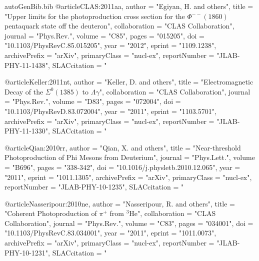\begin{filecontents*}{autoGenBib.bib}
@article{CLAS:2011aa,
      author         = "Egiyan, H. and others",
      title          = "{Upper limits for the photoproduction cross section for
                        the $\Phi^{--}(1860)$ pentaquark state off the deuteron}",
      collaboration  = "CLAS Collaboration",
      journal        = "Phys.Rev.",
      volume         = "C85",
      pages          = "015205",
      doi            = "10.1103/PhysRevC.85.015205",
      year           = "2012",
      eprint         = "1109.1238",
      archivePrefix  = "arXiv",
      primaryClass   = "nucl-ex",
      reportNumber   = "JLAB-PHY-11-1438",
      SLACcitation   = "%
}

@article{Keller:2011nt,
      author         = "Keller, D. and others",
      title          = "{Electromagnetic Decay of the $\Sigma^{0}(1385)$ to
                        $\Lambda\gamma$}",
      collaboration  = "CLAS Collaboration",
      journal        = "Phys.Rev.",
      volume         = "D83",
      pages          = "072004",
      doi            = "10.1103/PhysRevD.83.072004",
      year           = "2011",
      eprint         = "1103.5701",
      archivePrefix  = "arXiv",
      primaryClass   = "nucl-ex",
      reportNumber   = "JLAB-PHY-11-1330",
      SLACcitation   = "%
}

@article{Qian:2010rr,
      author         = "Qian, X. and others",
      title          = "{Near-threshold Photoproduction of Phi Mesons from
                        Deuterium}",
      journal        = "Phys.Lett.",
      volume         = "B696",
      pages          = "338-342",
      doi            = "10.1016/j.physletb.2010.12.065",
      year           = "2011",
      eprint         = "1011.1305",
      archivePrefix  = "arXiv",
      primaryClass   = "nucl-ex",
      reportNumber   = "JLAB-PHY-10-1235",
      SLACcitation   = "%
}

@article{Nasseripour:2010ne,
      author         = "Nasseripour, R. and others",
      title          = "{Coherent Photoproduction of $\pi^+$ from $^3$He}",
      collaboration  = "CLAS Collaboration",
      journal        = "Phys.Rev.",
      volume         = "C83",
      pages          = "034001",
      doi            = "10.1103/PhysRevC.83.034001",
      year           = "2011",
      eprint         = "1011.0073",
      archivePrefix  = "arXiv",
      primaryClass   = "nucl-ex",
      reportNumber   = "JLAB-PHY-10-1231",
      SLACcitation   = "%
}


\end{filecontents*}
